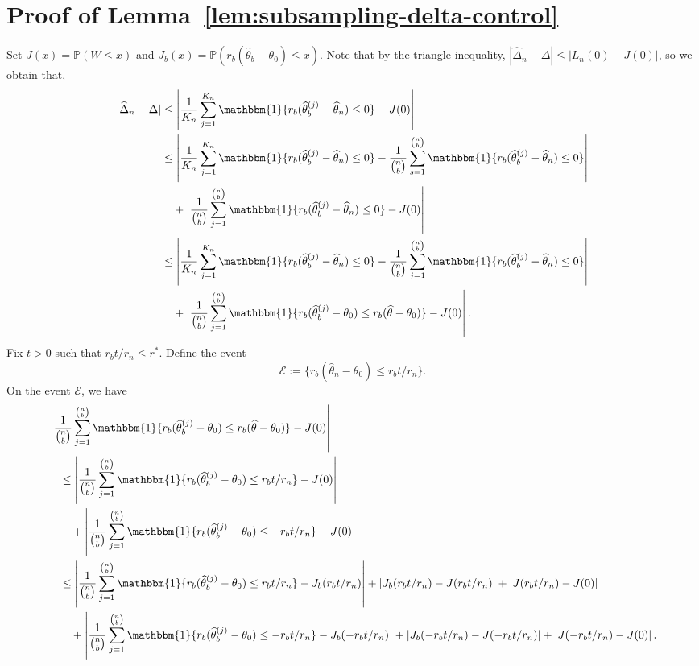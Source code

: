 \documentclass{article}
\numberwithin{myalgctr}{section}
\begin{document}
\section{Proof of Lemma~\ref{lem:subsampling-delta-control}}\label{appsec:subsampling-delta-control}
Set $J(x) = \mathbb{P}(W \le x)$ and $J_b(x) = \mathbb{P}(r_b(\widehat{\theta}_b - \theta_0) \le x)$.
Note that by the triangle inequality, $|\widehat{\Delta}_n - \Delta| \leq |L_n(0) - J(0)|$, so we obtain that,
\begin{align*}
|\widehat{\Delta}_n - \Delta| &\leq \left|\frac{1}{K_n}\sum_{j=1}^{K_n} \mathbbm{1}\{r_b(\widehat{\theta}_b^{(j)} - \widehat{\theta}_n) \le 0\} - J(0)\right|\\
&\le \left|\frac{1}{K_n}\sum_{j=1}^{K_n} \mathbbm{1}\{r_b(\widehat{\theta}_b^{(j)} - \widehat{\theta}_n) \le 0\} - \frac{1}{\binom{n}{b}}\sum_{s=1}^{\binom{n}{b}} \mathbbm{1}\{r_b(\widehat{\theta}_b^{(j)} - \widehat{\theta}_n) \le 0\}\right|
\\
&\quad
+ \left|\frac{1}{\binom{n}{b}}\sum_{j=1}^{\binom{n}{b}} \mathbbm{1}\{r_b(\widehat{\theta}_b^{(j)} - \widehat{\theta}_n) \le 0\} - J(0)\right|\\
&\le \left|\frac{1}{K_n}\sum_{j=1}^{K_n} \mathbbm{1}\{r_b(\widehat{\theta}_b^{(j)} - \widehat{\theta}_n) \le 0\} - \frac{1}{\binom{n}{b}}\sum_{j=1}^{\binom{n}{b}} \mathbbm{1}\{r_b(\widehat{\theta}_b^{(j)} - \widehat{\theta}_n) \le 0\}\right|\\
&\quad+\left|\frac{1}{\binom{n}{b}}\sum_{j=1}^{\binom{n}{b}} \mathbbm{1}\{r_b(\widehat{\theta}_b^{(j)} - \theta_0) \le r_b(\widehat{\theta} - \theta_0)\} - J(0)\right|.
\end{align*}
Fix $t > 0$ such that $r_bt/r_n \le r^*$. Define the event 
\[
\mathcal{E} := \{r_b(\widehat{\theta}_n - \theta_0) \le r_bt/r_n\}.
\]
On the event $\mathcal{E}$, we have
\begin{equation}
\begin{split}
&\left|\frac{1}{\binom{n}{b}}\sum_{j=1}^{\binom{n}{b}} \mathbbm{1}\{r_b(\widehat{\theta}_b^{(j)} - \theta_0) \le r_b(\widehat{\theta} - \theta_0)\} - J(0)\right|\\
&\quad\le \left|\frac{1}{\binom{n}{b}}\sum_{j=1}^{\binom{n}{b}} \mathbbm{1}\{r_b(\widehat{\theta}_b^{(j)} - \theta_0) \le r_bt/r_n\} - J(0)\right|\\
&\qquad+ \left|\frac{1}{\binom{n}{b}}\sum_{j=1}^{\binom{n}{b}} \mathbbm{1}\{r_b(\widehat{\theta}_b^{(j)} - \theta_0) \le -r_bt/r_n\} - J(0)\right|\\
&\quad\le \left|\frac{1}{\binom{n}{b}}\sum_{j=1}^{\binom{n}{b}} \mathbbm{1}\{r_b(\widehat{\theta}_b^{(j)} - \theta_0) \le r_bt/r_n\} - J_b(r_bt/r_n)\right| + \left|J_b(r_bt/r_n) - J(r_bt/r_n)\right| + \left|J(r_bt/r_n) - J(0)\right|\\
&\qquad+ \left|\frac{1}{\binom{n}{b}}\sum_{j=1}^{\binom{n}{b}} \mathbbm{1}\{r_b(\widehat{\theta}_b^{(j)} - \theta_0) \le -r_bt/r_n\} - J_b(-r_bt/r_n)\right| + \left|J_b(-r_bt/r_n) - J(-r_bt/r_n)\right| + \left|J(-r_bt/r_n) - J(0)\right|.
\end{split}
\end{equation}
\end{document}
